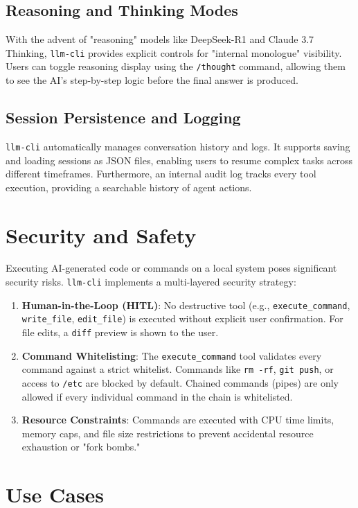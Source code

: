 \documentclass[conference]{IEEEtran}
\begin{document}
\subsection{Reasoning and Thinking Modes}
With the advent of "reasoning" models like DeepSeek-R1 and Claude 3.7 Thinking, \texttt{llm-cli} provides explicit controls for "internal monologue" visibility. Users can toggle reasoning display using the \texttt{/thought} command, allowing them to see the AI's step-by-step logic before the final answer is produced.

\subsection{Session Persistence and Logging}
\texttt{llm-cli} automatically manages conversation history and logs. It supports saving and loading sessions as JSON files, enabling users to resume complex tasks across different timeframes. Furthermore, an internal audit log tracks every tool execution, providing a searchable history of agent actions.

\section{Security and Safety}

Executing AI-generated code or commands on a local system poses significant security risks. \texttt{llm-cli} implements a multi-layered security strategy:

\begin{enumerate}
    \item \textbf{Human-in-the-Loop (HITL)}: No destructive tool (e.g., \texttt{execute\_command}, \texttt{write\_file}, \texttt{edit\_file}) is executed without explicit user confirmation. For file edits, a \texttt{diff} preview is shown to the user.
    \item \textbf{Command Whitelisting}: The \texttt{execute\_command} tool validates every command against a strict whitelist. Commands like \texttt{rm -rf}, \texttt{git push}, or access to \texttt{/etc} are blocked by default. Chained commands (pipes) are only allowed if every individual command in the chain is whitelisted.
    \item \textbf{Resource Constraints}: Commands are executed with CPU time limits, memory caps, and file size restrictions to prevent accidental resource exhaustion or "fork bombs."
\end{enumerate}

\section{Use Cases}
\end{document}
